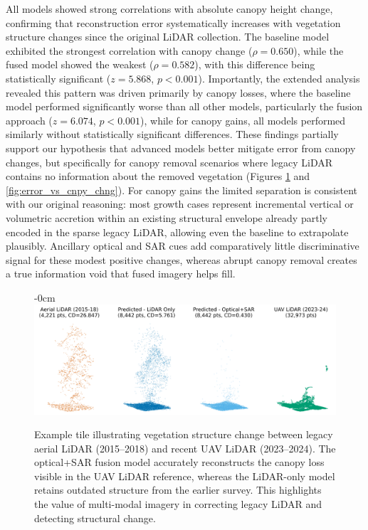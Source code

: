 \documentclass[remotesensing,article,submit,pdftex,moreauthors]{Definitions/mdpi}
\newenvironment{widefigure}[1][]{%
  \begin{figure}[#1]\begin{adjustwidth}{-\extralength}{0cm}\centering}{%
  \end{adjustwidth}\end{figure}}
\begin{document}
All models showed strong correlations with absolute canopy height change, confirming that reconstruction error systematically increases with vegetation structure changes since the original LiDAR collection. The baseline model exhibited the strongest correlation with canopy change ($\rho=0.650$), while the fused model showed the weakest ($\rho=0.582$), with this difference being statistically significant ($z=5.868$, $p<0.001$). Importantly, the extended analysis revealed this pattern was driven primarily by canopy losses, where the baseline model performed significantly worse than all other models, particularly the fusion approach ($z=6.074$, $p<0.001$), while for canopy gains, all models performed similarly without statistically significant differences. These findings partially support our hypothesis that advanced models better mitigate error from canopy changes, but specifically for canopy removal scenarios where legacy LiDAR contains no information about the removed vegetation (Figures \ref{fig:single_veg_loss_example} and \ref{fig:error_vs_cnpy_chng}). For canopy gains the limited separation is consistent with our original reasoning: most growth cases represent incremental vertical or volumetric accretion within an existing structural envelope already partly encoded in the sparse legacy LiDAR, allowing even the baseline to extrapolate plausibly. Ancillary optical and SAR cues add comparatively little discriminative signal for these modest positive changes, whereas abrupt canopy removal creates a true information void that fused imagery helps fill.

\begin{widefigure}
    \centering
    \includegraphics[width=1\linewidth]{manuscript/figures/single_veg_loss_example.png}
    \caption{Example tile illustrating vegetation structure change between legacy aerial LiDAR (2015--2018) and recent UAV LiDAR (2023--2024). The optical+SAR fusion model accurately reconstructs the canopy loss visible in the UAV LiDAR reference, whereas the LiDAR-only model retains outdated structure from the earlier survey. This highlights the value of multi-modal imagery in correcting legacy LiDAR and detecting structural change.}
    \label{fig:single_veg_loss_example}
\end{widefigure}
\end{document}

